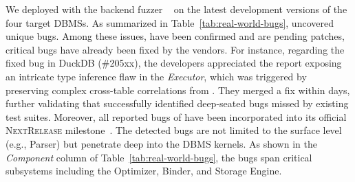 \documentclass[sigconf,review,anonymous]{acmart}
\begin{document}
We deployed \tool{} with the backend fuzzer \griffin{}~\cite{fu2022griffin} on the latest development versions of the four target DBMSs. As summarized in Table~\ref{tab:real-world-bugs}, \tool{} uncovered \bugcnt{} unique bugs. 
Among these issues, \bugconfirmcnt{} have been confirmed and are pending patches, \bugfixcnt{} critical bugs have already been fixed by the vendors. For instance, regarding the fixed bug in DuckDB (\#205xx), the developers appreciated the report exposing an intricate type inference flaw in the \textit{Executor}, which was triggered by preserving complex cross-table correlations from \pg{}. 
They merged a fix within days, further validating that \tool{} successfully identified deep-seated bugs missed by existing test suites.
Moreover, all reported bugs of \monetdb{} have been incorporated into its official \textsc{NextRelease} milestone~\cite{monetdb-nextrelease}.
The detected bugs are not limited to the surface level (e.g., Parser) but penetrate deep into the DBMS kernels. As shown in the \textit{Component} column of Table~\ref{tab:real-world-bugs}, the bugs span critical subsystems including the Optimizer, Binder, and Storage Engine.







\end{document}
